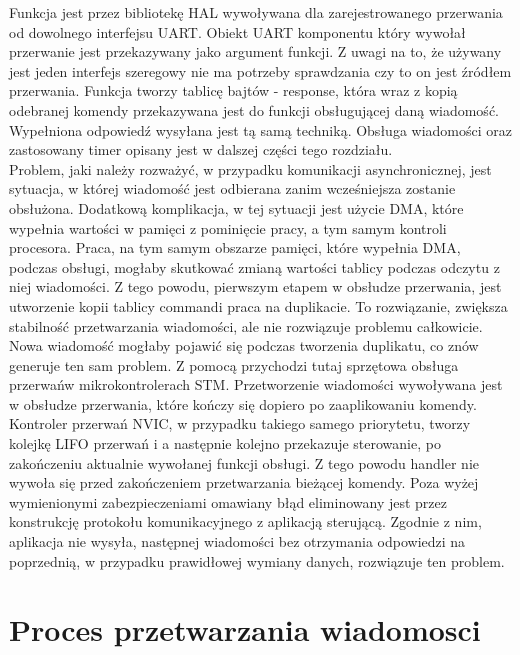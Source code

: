 \documentclass[eng,printmode]{mgr}
\begin{document}
Funkcja jest przez bibliotekę HAL wywoływana dla zarejestrowanego przerwania od dowolnego interfejsu UART. Obiekt UART komponentu który wywołał przerwanie jest przekazywany jako argument funkcji. Z uwagi na to, że używany jest jeden interfejs szeregowy nie ma potrzeby sprawdzania czy to on jest źródłem przerwania. Funkcja tworzy tablicę bajtów - response, która wraz z kopią odebranej komendy przekazywana jest do funkcji obsługującej daną wiadomość. Wypełniona odpowiedź wysyłana jest tą samą techniką. Obsługa wiadomości oraz zastosowany timer opisany jest w dalszej części tego rozdziału.
\\Problem, jaki należy rozważyć, w przypadku komunikacji asynchronicznej, jest sytuacja, w której wiadomość jest odbierana zanim wcześniejsza zostanie obsłużona. Dodatkową komplikacja, w tej sytuacji jest użycie DMA, które wypełnia wartości w pamięci z pominięcie pracy, a tym samym kontroli procesora. Praca, na tym samym obszarze pamięci, które wypełnia DMA, podczas obsługi, mogłaby skutkować zmianą wartości tablicy podczas odczytu z niej wiadomości. Z tego powodu, pierwszym etapem w obsłudze przerwania, jest utworzenie kopii tablicy commandi praca na duplikacie. To rozwiązanie, zwiększa stabilność przetwarzania wiadomości, ale nie rozwiązuje problemu całkowicie. Nowa wiadomość mogłaby pojawić się podczas tworzenia duplikatu, co znów generuje ten sam problem. Z pomocą przychodzi tutaj sprzętowa obsługa przerwańw mikrokontrolerach STM. Przetworzenie wiadomości wywoływana jest w obsłudze przerwania, które kończy się dopiero po zaaplikowaniu komendy. Kontroler przerwań NVIC, w przypadku takiego samego priorytetu, tworzy kolejkę LIFO przerwań i a następnie kolejno przekazuje sterowanie, po zakończeniu aktualnie wywołanej funkcji obsługi. Z tego powodu handler nie wywoła się przed zakończeniem przetwarzania bieżącej komendy. Poza wyżej wymienionymi zabezpieczeniami omawiany błąd eliminowany jest przez konstrukcję protokołu komunikacyjnego z aplikacją sterującą. Zgodnie z nim, aplikacja nie wysyła, następnej wiadomości bez otrzymania odpowiedzi na poprzednią, w przypadku prawidłowej wymiany danych, rozwiązuje ten problem.

 \section{Proces przetwarzania wiadomosci}
\end{document}

